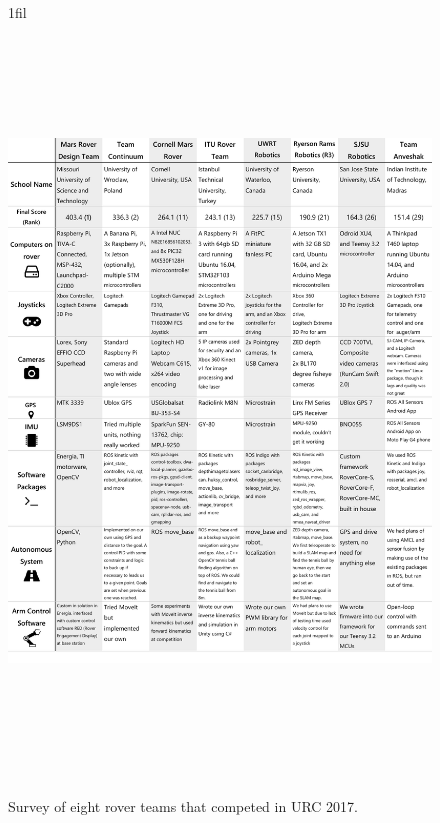 \documentclass[runningheads,a4paper]{llncs}
\makeatletter
\newcommand*{\centerfloat}{%
  \parindent \z@
  \leftskip \z@ \@plus 1fil \@minus \textwidth
  \rightskip\leftskip
  \parfillskip \z@skip}
\makeatother
\begin{document}
\begin{figure}
\centerfloat
\includegraphics[height=20cm]{surveyP1}
\label{fig:S1}
\caption{Survey of eight rover teams that competed in URC 2017.}
\end{figure}
\end{document}
